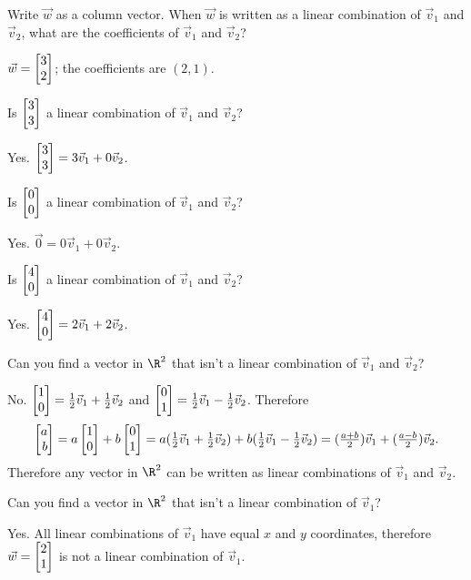 \documentclass{problemset}
\begin{document}
	\begin{parts}
		\item Write $\vec w$ as a column vector. When $\vec w$ is written as a
			linear combination of $\vec v_1$ and $\vec v_2$, what are the
			coefficients of $\vec v_1$ and $\vec v_2$?
			\begin{solution}
				$\vec w=\mat{3\\2}$; the coefficients are $(2,1)$.
			\end{solution}
		\item Is $\mat{3\\3}$ a linear combination of $\vec v_1$ and $\vec v_2$?
			\begin{solution}[inline]
				Yes. $\mat{3\\3}=3\vec v_1+0\vec v_2$.
			\end{solution}

		\item Is $\mat{0\\0}$ a linear combination of $\vec v_1$ and $\vec v_2$?
			\begin{solution}[inline]
				Yes. $\vec 0=0\vec v_1+0\vec v_2$.
			\end{solution}
		\item Is $\mat{4\\0}$ a linear combination of $\vec v_1$ and $\vec v_2$?
			\begin{solution}[inline]
				Yes. $\mat{4\\0}=2\vec v_1+2\vec v_2$.
			\end{solution}
		\item Can you find a vector in $\R^2$ that isn't a linear combination of
		$\vec v_1$ and $\vec v_2$?
			\begin{solution}
				No. $\mat{1\\0}=\tfrac{1}{2}\vec v_1+\tfrac{1}{2}\vec v_2$ and
				$\mat{0\\1}=\tfrac{1}{2}\vec v_1-\tfrac{1}{2}\vec v_2$.
				Therefore
				\[
					\mat{a\\b}
					= a\mat{1\\0}+b\mat{0\\1}
					= a(\tfrac{1}{2}\vec v_1+\tfrac{1}{2}\vec v_2)
						+b(\tfrac{1}{2}\vec v_1-\tfrac{1}{2}\vec v_2)
					=(\tfrac{a+b}{2})\vec v_1+(\tfrac{a-b}{2})\vec v_2.
				\]
				Therefore any vector in $\R^2$ can be written as linear combinations
				of $\vec v_1$ and $\vec v_2$.
			\end{solution}
		\item Can you find a vector in $\R^2$ that isn't a linear combination of
			$\vec v_1$?
			\begin{solution}
				Yes. All linear combinations of $\vec v_1$ have equal $x$ and
				$y$ coordinates, therefore $\vec w=\mat{2\\1}$ is not a linear
				combination of $\vec v_1$.
			\end{solution}
	\end{parts}
\end{document}

